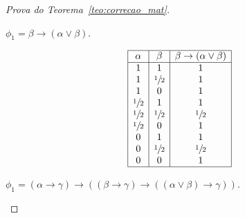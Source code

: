 \begin{proof}[Prova do Teorema~\ref{teo:correcao_mat}]
\begin{provaporcasos}
\begin{provaporsubcasos}
                \subcasodeprova{} $\phi_{1} = \beta \to (\alpha \lor \beta)$.

                \begin{center}
                    \[
                        \begin{array}{|c|c|c|}%
                            \hline%
                            \alpha      & \beta & \beta \to (\alpha \lor \beta) \\
                            \hline%
                            1 & 1 &1\\
                            1 & \meio{} &1\\
                            1 & 0 &1\\
                            \meio{} & 1 &1\\
                            \meio{} & \meio{} &\meio{}\\
                            \meio{} & 0 &1\\
                            0 & 1 &1\\
                            0 & \meio{} &\meio{}\\
                            0 & 0 &1\\
                            \hline%
                        \end{array}
                    \]
                \end{center}

                \subcasodeprova{} $\phi_{1} = (\alpha \to \gamma) \to ((\beta \to \gamma) \to ((\alpha \lor \beta) \to \gamma))$. 


\end{provaporsubcasos}
\end{provaporcasos}
\end{proof}
